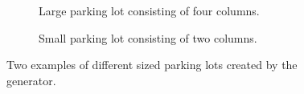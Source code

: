 \begin{figure}[H]
  \centering
  \begin{subfigure}[b]{0.485\textwidth}
    \caption{Large parking lot consisting of four columns.}
  \end{subfigure}
  \quad
  \begin{subfigure}[b]{0.45\textwidth}
    \caption{Small parking lot consisting of two columns.}
  \end{subfigure}
    \caption{Two examples of different sized parking lots created by the generator.}
  \label{fig:sizebased}
\end{figure}

